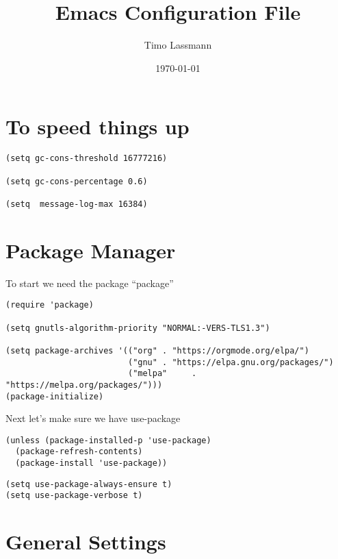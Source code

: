 \documentclass[12pt]{article}
\author{Timo Lassmann}
\date{\today}
\title{Emacs Configuration File}
\begin{document}
\maketitle

\section{To speed things up}
\label{sec:orge22e969}

\begin{verbatim}
(setq gc-cons-threshold 16777216)

(setq gc-cons-percentage 0.6)

(setq  message-log-max 16384)

\end{verbatim}

\section{Package Manager}
\label{sec:org8db6e51}
To start we need the package ``package'' 

\begin{verbatim}
(require 'package)

(setq gnutls-algorithm-priority "NORMAL:-VERS-TLS1.3")

(setq package-archives '(("org" . "https://orgmode.org/elpa/")
                         ("gnu" . "https://elpa.gnu.org/packages/")
                         ("melpa"     . "https://melpa.org/packages/")))
(package-initialize)
\end{verbatim}

Next let's make sure we have use-package

\begin{verbatim}
(unless (package-installed-p 'use-package)
  (package-refresh-contents)
  (package-install 'use-package))
\end{verbatim}

\begin{verbatim}
(setq use-package-always-ensure t)
(setq use-package-verbose t)
\end{verbatim}

\section{General Settings}
\label{sec:org232b13e}
\end{document}
